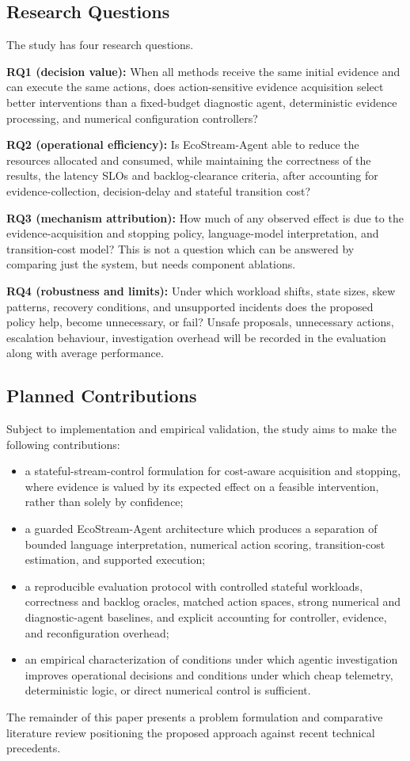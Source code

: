 \documentclass[journal]{IEEEtran}
\begin{document}
\subsection{Research Questions}
The study has four research questions.

\textbf{RQ1 (decision value):} When all methods receive the same initial evidence and can execute the same actions, does action-sensitive evidence acquisition select better interventions than a fixed-budget diagnostic agent, deterministic evidence processing, and numerical configuration controllers?

\textbf{RQ2 (operational efficiency):} Is EcoStream-Agent able to reduce the resources allocated and consumed, while maintaining the correctness of the results, the latency SLOs and backlog-clearance criteria, after accounting for evidence-collection, decision-delay and stateful transition cost?

\textbf{RQ3 (mechanism attribution):} How much of any observed effect is due to the evidence-acquisition and stopping policy, language-model interpretation, and transition-cost model? This is not a question which can be answered by comparing just the system, but needs component ablations.

\textbf{RQ4 (robustness and limits):} Under which workload shifts, state sizes, skew patterns, recovery conditions, and unsupported incidents does the proposed policy help, become unnecessary, or fail? Unsafe proposals, unnecessary actions, escalation behaviour, investigation overhead will be recorded in the evaluation along with average performance.

\subsection{Planned Contributions}
Subject to implementation and empirical validation, the study aims to make the following contributions:
\begin{itemize}
    \item a stateful-stream-control formulation for cost-aware acquisition and stopping, where evidence is valued by its expected effect on a feasible intervention, rather than solely by confidence;
    \item a guarded EcoStream-Agent architecture which produces a separation of bounded language interpretation, numerical action scoring, transition-cost estimation, and supported execution;
    \item a reproducible evaluation protocol with controlled stateful workloads, correctness and backlog oracles, matched action spaces, strong numerical and diagnostic-agent baselines, and explicit accounting for controller, evidence, and reconfiguration overhead;
    \item an empirical characterization of conditions under which agentic investigation improves operational decisions and conditions under which cheap telemetry, deterministic logic, or direct numerical control is sufficient.
\end{itemize}

The remainder of this paper presents a problem formulation and comparative literature review positioning the proposed approach against recent technical precedents.





\end{document}
